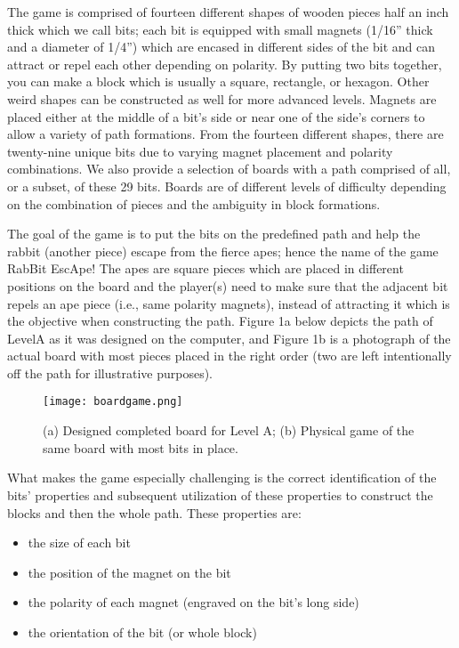 \documentclass{acm_proc_article-sp}
\begin{document}
The game is comprised of fourteen different shapes of wooden pieces half an inch thick which we call bits; each bit is equipped with small magnets (1/16'' thick and a diameter of 1/4'') which are encased in different sides of the bit and can attract or repel each other depending on polarity. By putting two bits together, you can make a block which is usually a square, rectangle, or hexagon. Other weird shapes can be constructed as well for more advanced levels. Magnets are placed either at the middle of a bit's side or near one of the side's corners to allow a variety of path formations. From the fourteen different shapes, there are twenty-nine unique bits due to varying magnet placement and polarity combinations. We also provide a selection of boards with a path comprised of all, or a subset, of these 29 bits. Boards are of different levels of difficulty depending on the combination of pieces and the ambiguity in block formations.

The goal of the game is to put the bits on the predefined path and help the rabbit (another piece) escape from the fierce apes; hence the name of the game RabBit EscApe! The apes are square pieces which are placed in different positions on the board and the player(s) need to make sure that the adjacent bit repels an ape piece (i.e., same polarity magnets), instead of attracting it which is the objective when constructing the path. Figure 1a below depicts the path of LevelA as it was designed on the computer, and Figure 1b is a photograph of the actual board with most pieces placed in the right order (two are left intentionally off the path for illustrative purposes).
\begin{figure}
  \texttt{[image: boardgame.png]}
  \caption{ (a) Designed completed board for Level A; (b) Physical game of the same board with most bits in place. }
  \label{fig:board-game}
\end{figure}

What makes the game especially challenging is the correct identification of the bits' properties and subsequent utilization of these properties to construct the blocks and then the whole path. These properties are:
\begin{itemize}
  \item{the size of each bit}
  \item{the position of the magnet on the bit}
  \item{the polarity of each magnet (engraved on the bit's long side)}
  \item{the orientation of the bit (or whole block)}
\end{itemize}
\end{document}
